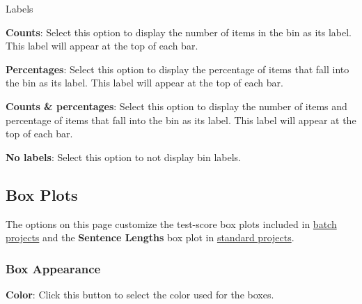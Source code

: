 \documentclass[
]{book}
\newenvironment{optionssection}
    {
    \begin{tcolorbox}[colframe=lightgray,colback=ultralightgray,sharp corners=all,parbox=false]
    }
    {
    \end{tcolorbox}
    }
\newenvironment{optionssectiontitle}
    {
    \begin{tcolorbox}[colframe=lightgray,colback=lightgray]
    \bfseries
    }
    {
    \end{tcolorbox}
    }
\theoremstyle{definition}
\theoremstyle{definition}
\theoremstyle{definition}
\theoremstyle{definition}
\theoremstyle{remark}
\begin{document}
\begin{optionssection}

\begin{optionssectiontitle}
Labels

\end{optionssectiontitle}

\textbf{Counts}: Select this option to display the number of items in the bin as its label. This label will appear at the top of each bar.

\textbf{Percentages}: Select this option to display the percentage of items that fall into the bin as its label. This label will appear at the top of each bar.

\textbf{Counts \& percentages}: Select this option to display the number of items and percentage of items that fall into the bin as its label. This label will appear at the top of each bar.

\textbf{No labels}: Select this option to not display bin labels.

\end{optionssection}

\hypertarget{options-box-plots}{%
\subsection*{Box Plots}\label{options-box-plots}}

The options on this page customize the test-score box plots included in \protect\hyperlink{creating-batch-project}{batch projects} and the \textbf{Sentence Lengths} box plot in \protect\hyperlink{creating-standard-project}{standard projects}.

\hypertarget{box-appearance}{%
\subsubsection*{Box Appearance}\label{box-appearance}}

\textbf{Color}: Click this button to select the color used for the boxes.
\end{document}
